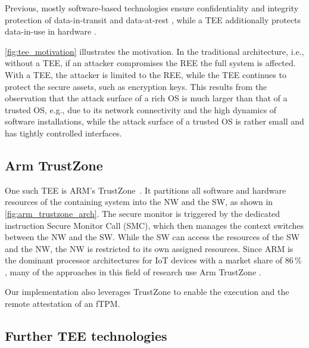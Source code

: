 
Previous, mostly software-based technologies ensure confidentiality and integrity protection of data-in-transit and data-at-rest \cite{Pecholt2022}, while a \ac{TEE} additionally protects data-in-use in hardware \cite{Pecholt2022, Lee:EECS-2022-96}.


\autoref{fig:tee_motivation} illustrates the motivation. In the traditional architecture, i.e., without a TEE, if an attacker compromises the \ac{REE} the full system is affected. With a \ac{TEE}, the attacker is limited to the \ac{REE}, while the \ac{TEE} continues to protect the secure assets, such as encryption keys. This results from the observation that the attack surface of a rich OS is much larger than that of a trusted OS, e.g., due to its network connectivity and the high dynamics of software installations, while the attack surface of a trusted OS is rather small and has tightly controlled interfaces.



\subsection{Arm TrustZone}

One such \ac{TEE} is ARM's TrustZone~\cite{ARM09, Ngabonziza2016}. It partitions all software and hardware resources of the containing system into the \ac{NW} and the \ac{SW}, as shown in \autoref{fig:arm_trustzone_arch}. The secure monitor is triggered by the dedicated instruction Secure Monitor Call (SMC), which then manages the context switches between the \ac{NW} and the \ac{SW}.
While the \ac{SW} can access the resources of the \ac{SW} and the \ac{NW}, the \ac{NW} is restricted to its own assigned resources.
Since ARM is the dominant processor architectures for IoT devices with a market share of 86\,\% \cite{eclipse}, many of the approaches in this field of research use Arm TrustZone \cite{Valadares2021}.



Our implementation also leverages TrustZone to enable the execution and the remote attestation of an fTPM.

\subsection{Further TEE technologies}

